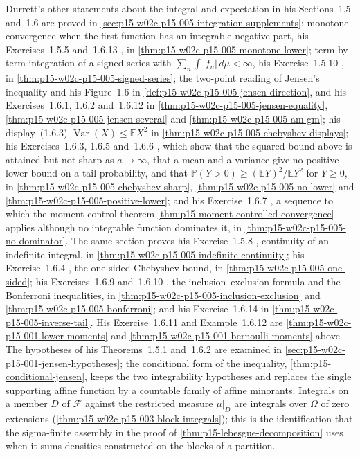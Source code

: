 Durrett's other statements about the integral and expectation in his
Sections~1.5 and~1.6 are proved in
\cref{sec:p15-w02c-p15-005-integration-supplements}: monotone convergence
when the first function has an integrable negative part, his
Exercises~1.5.5 and~1.6.13 \cite[pp.~28, 37]{DurrettPTEAuthor2019}, in
\cref{thm:p15-w02c-p15-005-monotone-lower}; term-by-term integration of a
signed series with \(\sum_n\int|f_n|\,d\mu<\infty\), his
Exercise~1.5.10 \cite[p.~28]{DurrettPTEAuthor2019}, in
\cref{thm:p15-w02c-p15-005-signed-series}; the two-point reading of
Jensen's inequality and his Figure~1.6
\cite[pp.~29--30]{DurrettPTEAuthor2019} in
\cref{def:p15-w02c-p15-005-jensen-direction}, and his
Exercises~1.6.1, 1.6.2 and~1.6.12 \cite[pp.~35, 37]{DurrettPTEAuthor2019}
in \cref{thm:p15-w02c-p15-005-jensen-equality},
\cref{thm:p15-w02c-p15-005-jensen-several} and
\cref{thm:p15-w02c-p15-005-am-gm}; his display~(1.6.3)
\(\operatorname{Var}(X)\leq\mathbb EX^2\) \cite[p.~33]{DurrettPTEAuthor2019}
in \cref{thm:p15-w02c-p15-005-chebyshev-displays}; his Exercises~1.6.3,
1.6.5 and~1.6.6 \cite[pp.~35--36]{DurrettPTEAuthor2019}, which show that
the squared bound above is attained but not sharp as \(a\to\infty\), that a
mean and a variance give no positive lower bound on a tail probability,
and that \(\mathbb P(Y>0)\geq(\mathbb EY)^2/\mathbb EY^2\) for
\(Y\geq0\), in \cref{thm:p15-w02c-p15-005-chebyshev-sharp},
\cref{thm:p15-w02c-p15-005-no-lower} and
\cref{thm:p15-w02c-p15-005-positive-lower}; and his Exercise~1.6.7
\cite[p.~36]{DurrettPTEAuthor2019}, a sequence to which the
moment-control theorem \cref{thm:p15-moment-controlled-convergence}
applies although no integrable function dominates it, in
\cref{thm:p15-w02c-p15-005-no-dominator}. The same section proves his
Exercise~1.5.8 \cite[p.~28]{DurrettPTEAuthor2019}, continuity of an
indefinite integral, in \cref{thm:p15-w02c-p15-005-indefinite-continuity};
his Exercise~1.6.4 \cite[p.~36]{DurrettPTEAuthor2019}, the one-sided
Chebyshev bound, in \cref{thm:p15-w02c-p15-005-one-sided}; his
Exercises~1.6.9 and~1.6.10 \cite[pp.~36--37]{DurrettPTEAuthor2019}, the
inclusion--exclusion formula and the Bonferroni inequalities, in
\cref{thm:p15-w02c-p15-005-inclusion-exclusion} and
\cref{thm:p15-w02c-p15-005-bonferroni}; and his Exercise~1.6.14
\cite[p.~37]{DurrettPTEAuthor2019} in
\cref{thm:p15-w02c-p15-005-inverse-tail}. His Exercise~1.6.11 and
Example~1.6.12 are \cref{thm:p15-w02c-p15-001-lower-moments} and
\cref{thm:p15-w02c-p15-001-bernoulli-moments} above. The hypotheses of his
Theorems~1.5.1 and~1.6.2 \cite[pp.~25, 29]{DurrettPTEAuthor2019} are
examined in \cref{sec:p15-w02c-p15-001-jensen-hypotheses}; the
conditional form of the inequality, \cref{thm:p15-conditional-jensen},
keeps the two integrability hypotheses and replaces the single supporting
affine function by a countable family of affine minorants. Integrals on a member \(D\) of
\(\mathcal F\) against the restricted measure \(\mu|_D\) are integrals
over \(\Omega\) of zero extensions
(\cref{thm:p15-w02c-p15-003-block-integrals}); this is the identification
that the sigma-finite assembly in the proof of
\cref{thm:p15-lebesgue-decomposition} uses when it sums densities
constructed on the blocks of a partition.

